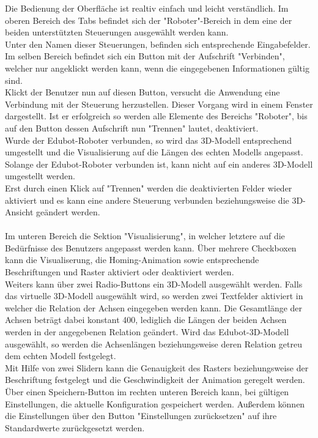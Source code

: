 Die Bedienung der Oberfläche ist realtiv einfach und leicht verständlich. Im oberen Bereich des Tabs befindet sich der "Roboter"-Bereich in dem eine der beiden unterstützten Steuerungen ausgewählt werden kann.\\ 
Unter den Namen dieser Steuerungen, befinden sich entsprechende Eingabefelder. Im selben Bereich befindet sich ein Button mit der Aufschrift "Verbinden", welcher nur angeklickt werden kann, wenn die eingegebenen Informationen gültig sind.\\
Klickt der Benutzer nun auf diesen Button, versucht die Anwendung eine Verbindung mit der Steuerung herzustellen. Dieser Vorgang wird in einem Fenster dargestellt. Ist er erfolgreich so werden alle Elemente des Bereichs "Roboter", bis auf den Button dessen Aufschrift nun "Trennen" lautet, deaktiviert. \\
Wurde der Edubot-Roboter verbunden, so wird das 3D-Modell entsprechend umgestellt und die Visualisierung auf die Längen des echten Modells angepasst. Solange der Edubot-Roboter verbunden ist, kann nicht auf ein anderes 3D-Modell umgestellt werden.\\
Erst durch einen Klick auf "Trennen" werden die deaktivierten Felder wieder aktiviert und es kann eine andere Steuerung verbunden beziehungsweise die 3D-Ansicht geändert werden.\\
\\
Im unteren Bereich die Sektion "Visualisierung", in welcher letztere auf die Bedürfnisse des Benutzers angepasst werden kann. Über mehrere Checkboxen kann die Visualiserung, die Homing-Animation sowie entsprechende Beschriftungen und Raster aktiviert oder deaktiviert werden. \\
Weiters kann über zwei Radio-Buttons ein 3D-Modell ausgewählt werden. Falls das virtuelle 3D-Modell ausgewählt wird, so werden zwei Textfelder aktiviert in welcher die Relation der Achsen eingegeben werden kann. Die Gesamtlänge der Achsen beträgt dabei konstant 400, lediglich die Längen der beiden Achsen werden in der angegebenen Relation geändert. Wird das Edubot-3D-Modell ausgewählt, so werden die Achsenlängen beziehungsweise deren Relation getreu dem echten Modell festgelegt.\\
Mit Hilfe von zwei Slidern kann die Genauigkeit des Rasters beziehungsweise der Beschriftung festgelegt und die Geschwindigkeit der Animation geregelt werden.\\
Über einen Speichern-Button im rechten unteren Bereich kann, bei gültigen Einstellungen, die aktuelle Konfiguration gespeichert werden. Außerdem können die Einstellungen über den Button "Einstellungen zurücksetzen" auf ihre Standardwerte zurückgesetzt werden.

